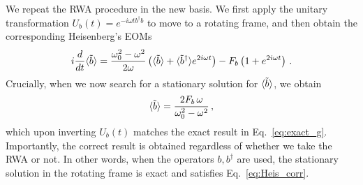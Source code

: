 We repeat the RWA procedure in the new basis. We first apply the unitary transformation $U_b(t) = e^{-i \omega t b^\dagger b}$ to move to a rotating frame, and then obtain the corresponding Heisenberg's EOMs
\begin{equation} \label{eq:Heis_corr}
i \frac{d}{dt} \langle\tilde{b}\rangle = \frac{\omega_0^2 - \omega^2}{2\omega} \left( \langle\tilde{b}\rangle +  \langle \tilde{b}^\dagger \rangle e^{2 i \omega t}\right) - F_b\left(1  + e^{2 i \omega t} \right)\,.
\end{equation}
Crucially, when we now search for a stationary solution for $\langle\tilde{b}\rangle$, we obtain
\begin{equation}
\langle\tilde{b}\rangle = \frac{2F_b\,\omega}{\omega_0^2 - \omega^2} \,,
\label{eq:main_res}
\end{equation}
which upon inverting $U_b(t)$ matches the exact result in Eq.~\eqref{eq:exact_g}. Importantly, the correct result is obtained regardless of whether we take the RWA or not. In other words, when the operators $b, b^\dagger$ are used, the stationary solution in the rotating frame is exact and satisfies Eq.~\eqref{eq:Heis_corr}.

